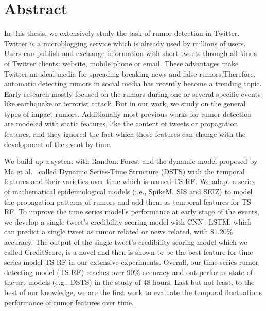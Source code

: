 
\chapter{Abstract}
 
In this thesis, we extensively study the task of rumor detection in Twitter. Twitter is a microblogging service which is already used by millions of users. Users can publish and exchange information with short tweets through all kinds of Twitter clients: website, mobile phone or email. These advantages make Twitter an ideal media for spreading breaking news and false rumors.Therefore, automatic detecting rumors in social media has recently become a trending topic. Early research mostly focused on the rumors during one or several specific events like earthquake or terrorist attack. But in our work, we study on the general types of impact rumors. Additionally most previous works for rumor detection are modeled with static features, like the content of tweets or propagation features, and they ignored the fact which those features can change with the development of the event by time.

We build up a system with Random Forest and the dynamic model proposed by Ma et al.~\cite{ma2015detect} called Dynamic Series-Time Structure (DSTS) with the temporal features and their varieties over time which is named TS-RF. We adapt a series of mathematical epidemiological models (i.e., SpikeM, SIS and SEIZ) to model the propagation patterns of rumors and add them as temporal features for TS-RF. To improve the time series model's performance at early stage of the events, we develop a single tweet's credibility scoring model with CNN+LSTM, which can predict a single tweet as rumor related or news related, with 81.20\% accuracy. The output of the single tweet's credibility scoring model which we called CreditScore, is a novel and then is shown to be the best feature for time series model TS-RF in our extensive experiments. Overall, our time series rumor detecting model (TS-RF) reaches over 90\% accuracy and out-performs state-of-the-art models (e.g., DSTS) in the study of 48 hours. Last but not least, to the best of our knowledge, we are the first work to evaluate the temporal fluctuations performance of rumor features over time.


